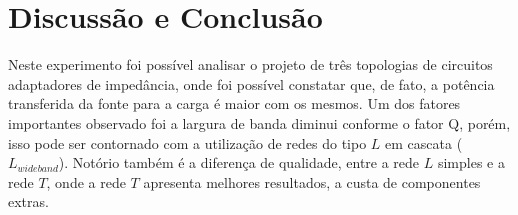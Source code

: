 \newpage
\section{Discussão e Conclusão}
Neste experimento foi possível analisar o projeto de três topologias de circuitos adaptadores de impedância, onde foi possível constatar que, de fato, a potência transferida da fonte para a carga é maior com os mesmos.
Um dos fatores importantes observado foi a largura de banda diminui conforme o fator Q, porém, isso pode ser contornado com a utilização de redes do tipo $L$ em cascata ($L_{wideband}$).
Notório também é a diferença de qualidade, entre a rede $L$ simples e a rede $T$, onde a rede $T$ apresenta melhores resultados, a custa de componentes extras.